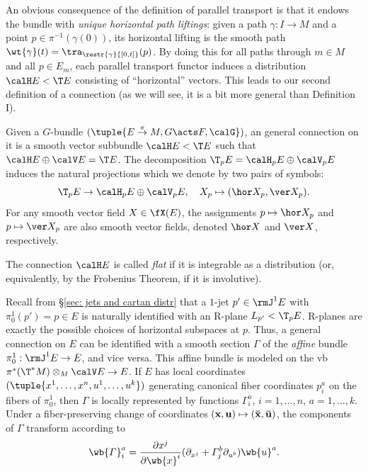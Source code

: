 An obvious consequence of the definition of parallel transport is that it endows the bundle with \emph{unique horizontal path liftings}: given a path $\gamma:I\to M$ and a point $p\in\pi^{-1}(\gamma(0))$, its horizontal lifting is the smooth path $\wt{\gamma}(t)=\tra_{\restr{\gamma}{[0,t]}}(p)$. By doing this for all paths through $m\in M$ and all $p\in E_m$, each parallel transport functor induces a distribution $\calH E<\T E$ consisting of ``horizontal'' vectors. This leads to our second definition of a connection (as we will see, it is a bit more general than Definition I).


\begin{defn}
    Given a $G$-bundle $(\tuple{E\overset{\pi}{\to}M,G\acts F,\calG})$, an general connection on it is a smooth vector subbundle $\calH E<\T E$ such that $\calH E\oplus \calV E=\T E$. The decomposition $\T_pE=\calH_pE\oplus \calV_pE$ induces the natural projections which we denote by two pairs of symbols:
    \[\T_pE\to \calH_pE\oplus \calV_pE,\quad X_p\mapsto (\hor X_p,\ver X_p).\]
    For any smooth vector field $X\in\fX(E)$, the assignments $p\mapsto \hor X_p$ and $p\mapsto \ver X_p$ are also smooth vector fields, denoted $\hor X$ and $\ver X$, respectively.

    The connection $\calH E$ is called \emph{flat} if it is integrable as a distribution (or, equivalently, by the Frobenius Theorem, if it is involutive).
\end{defn}


\begin{rem}\label{rem connections via jets}
    Recall from \S\ref{sec: jets and cartan distr} that a $1$-jet $p'\in \rmJ^1 E$ with $\pi^1_0(p')=p\in E$ is naturally identified with an R-plane $L_{p'}<\T_p E$. R-planes are exactly the possible choices of horizontal subspaces at $p$. Thus, a general connection on $E$ can be identified with a smooth section $\varGamma$ of the \emph{affine} bundle $\pi^1_0:\rmJ^1 E\to E$, and vice versa. This affine bundle is modeled on the \gls{vb} $\pi^\ast(\T^\ast M)\otimes_M \calV E\to E$. If $E$ has local coordinates $(\tuple{x^1,\ldots,x^n,u^1,\ldots,u^k})$ generating canonical fiber coordinates $p^a_i$ on the fibers of $\pi^1_0$, then $\varGamma$ is locally represented by functions $\varGamma^a_i$, $i=1,\ldots,n$, $a=1,\ldots,k$. Under a fiber-preserving change of coordinates $(\bf{x},\bf{u})\mapsto (\bar{\bf{x}},\bar{\bf{u}})$, the components of $\varGamma$ transform according to 
    \[\wb{\varGamma}^a_i=\frac{\partial x^j}{\partial \wb{x}^i}(\partial_{x^j}+\varGamma^b_j\partial_{u^b})\wb{u}^a.\]
\end{rem}

